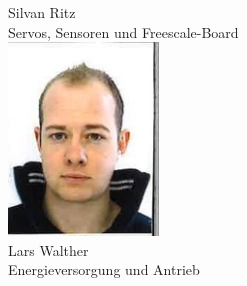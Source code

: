 \begin{minipage}{0.49\textwidth}
\begin{flushleft}
Silvan Ritz\\
Servos, Sensoren und Freescale-Board\\
\includegraphics[width=0.3\textwidth]{./04_Projektmanagement/fig/larswalther.jpg}\\
Lars Walther\\
Energieversorgung und Antrieb\\
\end{flushleft}
\end{minipage}
\hfill
